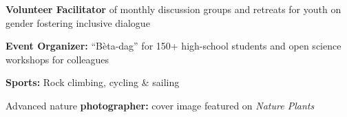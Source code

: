 \documentclass[a4paper,10pt]{article}
\begin{document}

\begin{description}
  \raggedright
  \item \textbf{Volunteer Facilitator} of monthly discussion groups and retreats for youth on gender fostering inclusive dialogue
  \item \textbf{Event Organizer:} “Bèta-dag” for 150+ high-school students and open science workshops for colleagues
  \item \textbf{Sports:} Rock climbing, cycling \& sailing
  \item Advanced nature \textbf{photographer:} cover image featured on \emph{Nature Plants}
\end{description}
\end{document}
